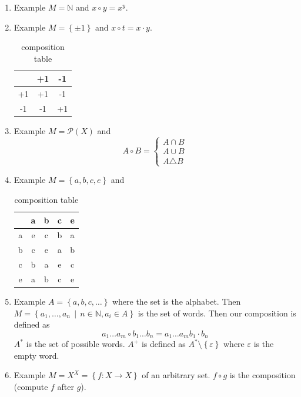 \documentclass[a4paper,landscape,twocolumn]{article}
\newcommand\set[1]{\left\{#1\right\}}
\newcommand\setdef[2]{\left\{#1\,\middle|\,#2\right\}}
\begin{document}
\begin{enumerate}
  \item Example $M = \mathbb{N}$ and $x \circ y = x^y$.
  \item Example $M = \set{\pm 1}$ and $x \circ t = x \cdot y$.

    \begin{table}[!ht]
      \begin{center}
        \begin{tabular}{c|cc}
         & +1 & -1 \\
        \hline
          +1 & +1 & -1 \\
          -1 & -1 & +1
        \end{tabular}
        \caption{composition table}
      \end{center}
    \end{table}

  \item Example $M = \mathcal{P}(X)$ and
    \[
      A \circ B =
      \begin{cases}
        A \cap B \\
        A \cup B \\
        A \triangle B
      \end{cases}
    \]

  \item Example $M = \set{a, b, c, e}$ and

    \begin{table}[!ht]
      \begin{center}
        \begin{tabular}{c|cccc}
            & a & b & c & e \\
         \hline
          a & e & c & b & a \\
          b & c & e & a & b \\
          c & b & a & e & c \\
          e & a & b & c & e \\
        \end{tabular}
        \caption{composition table}
      \end{center}
    \end{table}

  \item
    Example $A = \set{a, b, c, \dots}$ where the set is the alphabet.
    Then $M = \setdef{a_1, \ldots, a_n}{n \in \mathbb{N}, a_i \in A}$ is the set of words.
    Then our composition is defined as
    \[ a_1 \ldots a_m \circ b_1 \ldots b_n = a_1 \ldots a_m b_1 \cdot b_n \]
    $A^*$ is the set of possible words.
    $A^+$ is defined as $A^* \setminus \set{\varepsilon}$ where $\varepsilon$ is the empty word.

  \item
    Example $M = X^X = \set{f: X \rightarrow X}$ of an arbitrary set. $f \circ g$ is the composition (compute $f$ after $g$).
\end{enumerate}
\end{document}
